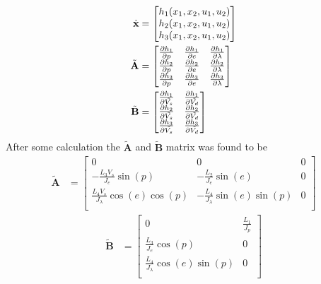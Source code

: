\begin{subequations}
    \begin{align}
    \dot{\textbf{x}} &= \begin{bmatrix}\label{Lin matrix}
        h_1(x_1, x_2, u_1, u_2)\\
        h_2(x_1, x_2, u_1, u_2)\\
        h_3(x_1, x_2, u_1, u_2)
    \end{bmatrix}\\
    \tilde{\textbf{A}} &=\begin{bmatrix}{\label{A matrix}}
        \frac{\partial h_1}{\partial p} & \frac{\partial h_1}{\partial e}  & \frac{\partial h_1}{\partial \lambda}\\
        \frac{\partial h_2}{\partial p} & \frac{\partial h_2}{\partial e}  & \frac{\partial h_2}{\partial \lambda}\\
        \frac{\partial h_3}{\partial p} & \frac{\partial h_3}{\partial e}  & \frac{\partial h_3}{\partial \lambda}\\
    \end{bmatrix}\\
    \tilde{\textbf{B}} &= \begin{bmatrix}{\label{B matrix}}
        \frac{\partial h_1}{\partial \tilde{V_s}} & \frac{\partial h_1}{\partial \tilde{V_d}}\\
        \frac{\partial h_2}{\partial \tilde{V_s}} & \frac{\partial h_2}{\partial \tilde{V_d}}\\
        \frac{\partial h_3}{\partial \tilde{V_s}} & \frac{\partial h_3}{\partial \tilde{V_d}}\\
    \end{bmatrix}
    \end{align}
\end{subequations}
After some calculation the $\tilde{\textbf{A}}$ and $\tilde{\textbf{B}}$ matrix was found to be 
    \begin{align}
    \tilde{\textbf{A}} &=\begin{bmatrix}
        0 & 0  & 0\\
        -\frac{L_3 V_s}{J_e} \sin(p) & -\frac{L_2}{J_e}\sin(e)  & 0\\
        \frac{L_4 V_s}{J_\lambda}\cos(e) \cos(p) & -\frac{L_4}{J_\lambda} \sin(e) \sin(p)  & 0\\
    \end{bmatrix}
    \end{align}
        \begin{align}
    \tilde{\textbf{B}} &= \begin{bmatrix}
        0 & \frac{L_1}{J_p}\\
        \frac{L_3}{J_e} \cos(p) & 0\\
        \frac{ L_4}{J_ \lambda} \cos(e) \sin(p) & 0\\
    \end{bmatrix}
    \end{align}
